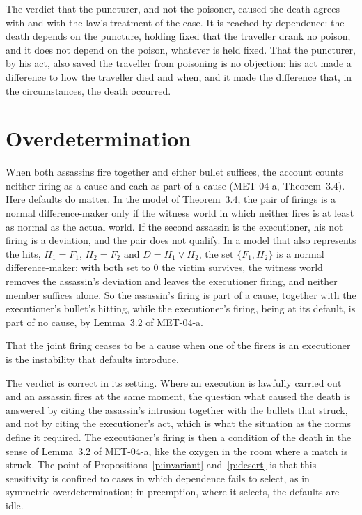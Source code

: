 \documentclass{situationist-preprint}
\begin{document}
The verdict that the puncturer, and not the poisoner, caused the death agrees with \citet{HartHonore1985} and with the law's treatment of the case. It is reached by dependence: the death depends on the puncture, holding fixed that the traveller drank no poison, and it does not depend on the poison, whatever is held fixed. That the puncturer, by his act, also saved the traveller from poisoning is no objection: his act made a difference to how the traveller died and when, and it made the difference that, in the circumstances, the death occurred.

\section{Overdetermination}

When both assassins fire together and either bullet suffices, the account counts neither firing as a cause and each as part of a cause (MET-04-a, Theorem~3.4). Here defaults do matter. In the model of Theorem~3.4, the pair of firings is a normal difference-maker only if the witness world in which neither fires is at least as normal as the actual world. If the second assassin is the executioner, his not firing is a deviation, and the pair does not qualify. In a model that also represents the hits, $H_1 = F_1$, $H_2 = F_2$ and $D = H_1 \vee H_2$, the set $\{F_1, H_2\}$ is a normal difference-maker: with both set to $0$ the victim survives, the witness world removes the assassin's deviation and leaves the executioner firing, and neither member suffices alone. So the assassin's firing is part of a cause, together with the executioner's bullet's hitting, while the executioner's firing, being at its default, is part of no cause, by Lemma~3.2 of MET-04-a.

\begin{objection}
That the joint firing ceases to be a cause when one of the firers is an executioner is the instability that defaults introduce.
\end{objection}

\begin{reply}
The verdict is correct in its setting. Where an execution is lawfully carried out and an assassin fires at the same moment, the question what caused the death is answered by citing the assassin's intrusion together with the bullets that struck, and not by citing the executioner's act, which is what the situation as the norms define it required. The executioner's firing is then a condition of the death in the sense of Lemma~3.2 of MET-04-a, like the oxygen in the room where a match is struck. The point of Propositions~\ref{p:invariant} and~\ref{p:desert} is that this sensitivity is confined to cases in which dependence fails to select, as in symmetric overdetermination; in preemption, where it selects, the defaults are idle.
\end{reply}
\end{document}
